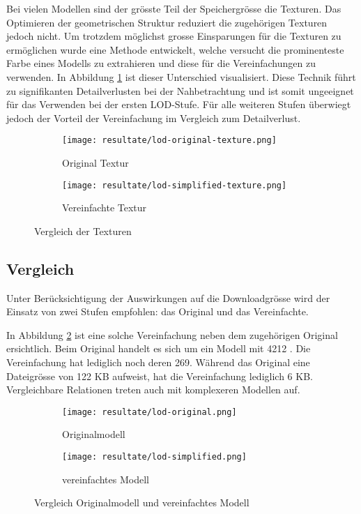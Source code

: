 Bei vielen Modellen sind der grösste Teil der Speichergrösse die Texturen. Das Optimieren der geometrischen Struktur reduziert die zugehörigen Texturen jedoch nicht. Um trotzdem möglichst grosse Einsparungen für die Texturen zu ermöglichen wurde eine Methode entwickelt, welche versucht die prominenteste Farbe eines Modells zu extrahieren und diese für die Vereinfachungen zu verwenden.
In Abbildung \ref{fig:textureComparison} ist dieser Unterschied visualisiert.
Diese Technik führt zu signifikanten Detailverlusten bei der Nahbetrachtung und ist somit ungeeignet für das Verwenden bei der ersten LOD-Stufe. Für alle weiteren Stufen überwiegt jedoch der Vorteil der Vereinfachung im Vergleich zum Detailverlust.
\begin{figure}[H]
  \centering
  \begin{subfigure}{.4\textwidth}
    \centering
    \texttt{[image: resultate/lod-original-texture.png]}
    \caption{Original Textur}
  \end{subfigure}
  \begin{subfigure}{.4\textwidth}
    \centering
    \texttt{[image: resultate/lod-simplified-texture.png]}
    \caption{Vereinfachte Textur}
  \end{subfigure}
  \caption{Vergleich der Texturen}
  \label{fig:textureComparison}
\end{figure}

\subsection{Vergleich}

Unter Berücksichtigung der Auswirkungen auf die Downloadgrösse wird der Einsatz von zwei Stufen empfohlen: das Original und das Vereinfachte.

In Abbildung \ref{fig:lodComparison} ist eine solche Vereinfachung neben dem zugehörigen Original ersichtlich. Beim Original handelt es sich um ein Modell mit 4212 . Die Vereinfachung hat lediglich noch deren 269. Während das Original eine Dateigrösse von 122 KB aufweist, hat die Vereinfachung lediglich 6 KB. Vergleichbare Relationen treten auch mit komplexeren Modellen auf.

\begin{figure}[H]
  \centering
  \begin{subfigure}{.4\textwidth}
    \centering
    \texttt{[image: resultate/lod-original.png]}
    \caption{Originalmodell}
  \end{subfigure}
  \begin{subfigure}{.4\textwidth}
    \centering
    \texttt{[image: resultate/lod-simplified.png]}
    \caption{vereinfachtes Modell}
  \end{subfigure}
  \caption{Vergleich Originalmodell und vereinfachtes Modell}
  \label{fig:lodComparison}
\end{figure}

